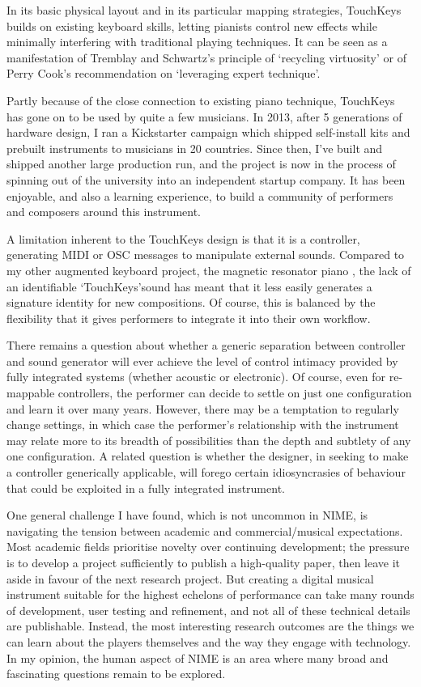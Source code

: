In its basic physical layout and in its particular mapping strategies, TouchKeys builds on existing keyboard skills, letting pianists control new effects while minimally interfering with traditional playing techniques. It can be seen as a manifestation of Tremblay and Schwartz's principle of \lq recycling virtuosity\rq \cite{Tremblay:2010} or of Perry Cook's recommendation on \lq leveraging expert technique\rq \cite{Cook:2001}.

Partly because of the close connection to existing piano technique, TouchKeys has gone on to be used by quite a few musicians. In 2013, after 5 generations of hardware design, I ran a Kickstarter campaign which shipped self-install kits and prebuilt instruments to musicians in 20 countries. Since then, I've built and shipped another large production run, and the project is now in the process of spinning out of the university into an independent startup company. It has been enjoyable, and also a learning experience, to build a community of performers and composers around this instrument.

A limitation inherent to the TouchKeys design is that it is a controller, generating MIDI or OSC messages to manipulate external sounds. Compared to my other augmented keyboard project, the magnetic resonator piano \cite{McPherson:2015a}, the lack of an identifiable \lq TouchKeys\rq sound has meant that it less easily generates a signature identity for new compositions. Of course, this is balanced by the flexibility that it gives performers to integrate it into their own workflow. 

There remains a question about whether a generic separation between controller and sound generator will ever achieve the level of control intimacy provided by fully integrated systems (whether acoustic or electronic). Of course, even for re-mappable controllers, the performer can decide to settle on just one configuration and learn it over many years. However, there may be a temptation to regularly change settings, in which case the performer's relationship with the instrument may relate more to its breadth of possibilities than the depth and subtlety of any one configuration. A related question is whether the designer, in seeking to make a controller generically applicable, will forego certain idiosyncrasies of behaviour that could be exploited in a fully integrated instrument.

One general challenge I have found, which is not uncommon in NIME, is navigating the tension between academic and commercial/musical expectations. Most academic fields prioritise novelty over continuing development; the pressure is to develop a project sufficiently to publish a high-quality paper, then leave it aside in favour of the next research project. But creating a digital musical instrument suitable for the highest echelons of performance can take many rounds of development, user testing and refinement, and not all of these technical details are publishable. Instead, the most interesting research outcomes are the things we can learn about the players themselves and the way they engage with technology. In my opinion, the human aspect of NIME is an area where many broad and fascinating questions remain to be explored.

